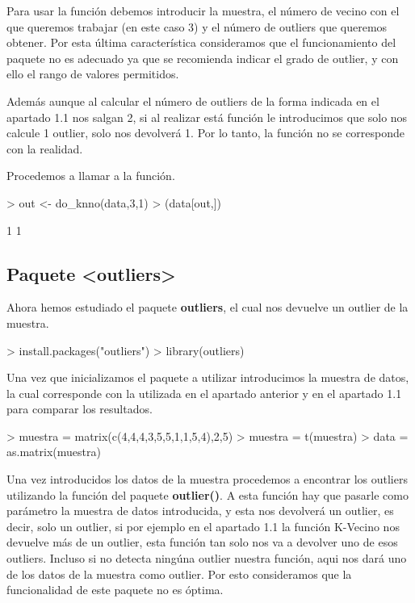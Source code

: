 \documentclass [a4paper] {article}
\begin{document}
\bigskip
Para usar la función debemos introducir la muestra, el número de vecino con el que queremos trabajar
(en este caso 3) y el número de outliers que queremos obtener. Por esta última característica 
consideramos que el funcionamiento del paquete no es adecuado ya que se recomienda indicar el grado
de outlier, y con ello el rango de valores permitidos.

\bigskip
Además aunque al calcular el número de outliers de la forma indicada en el apartado 1.1 nos salgan 2,
si al realizar está función le introducimos que solo nos calcule 1 outlier, solo nos devolverá 1.
Por lo tanto, la función no se corresponde con la realidad.

\bigskip
Procedemos a llamar a la función.
\begin{Schunk}
\begin{Sinput}
> out <- do_knno(data,3,1)
> (data[out,])
\end{Sinput}
\begin{Soutput}
[1] 1 1
\end{Soutput}
\end{Schunk}

\subsection{Paquete <outliers>}
\bigskip
Ahora hemos estudiado el paquete \textbf{outliers}, el cual nos devuelve un outlier de la muestra.
\begin{Schunk}
\begin{Sinput}
> install.packages("outliers")
> library(outliers)
\end{Sinput}
\end{Schunk}

\bigskip
Una vez que inicializamos el paquete a utilizar introducimos la muestra de datos, la cual corresponde
con la utilizada en el apartado anterior y en el apartado 1.1 para comparar los resultados.
\begin{Schunk}
\begin{Sinput}
> muestra = matrix(c(4,4,4,3,5,5,1,1,5,4),2,5)
> muestra = t(muestra)
> data = as.matrix(muestra)
\end{Sinput}
\end{Schunk}

\bigskip
Una vez introducidos los datos de la muestra procedemos a encontrar los outliers utilizando la función
del paquete \textbf{outlier()}. A esta función hay que pasarle como parámetro la muestra de datos introducida,
y esta nos devolverá un outlier, es decir, solo un outlier, si por ejemplo en el apartado 1.1 la función
K-Vecino nos devuelve más de un outlier, esta función tan solo nos va a devolver uno de esos outliers. Incluso
si no detecta ningúna outlier nuestra función, aqui nos dará uno de los datos de la muestra como outlier.
Por esto consideramos que la funcionalidad de este paquete no es óptima.
\end{document}
